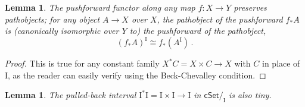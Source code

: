\documentclass[11pt,reqno]{amsart}
\newcommand{\cSet}{\ensuremath{\mathsf{cSet}}}
\renewcommand{\to}{\ensuremath{\rightarrow}}
\newcommand{\I}{\ensuremath{\mathrm{I}}}
\newtheorem{lemma}[theorem]{Lemma}
\theoremstyle{remark}
\theoremstyle{definition}
\begin{document}
\begin{lemma}\label{lemma:pathspacepushforward}
The pushforward functor along any map $f : X\to Y$ preserves pathobjects; for any object $A \to X$ over $X$, the pathobject of the pushforward $f_*A$ is (canonically isomorphic over $Y$ to) the pushforward of the pathobject,
\[
(f_*A)^\I \cong f_*(A^\I)\,.
\]
\end{lemma}
\begin{proof}
This is true for any constant family $X^*C = X\times C \to X$ with $C$ in place of $\I$, as the reader can easily verify using the Beck-Chevalley condition.
\end{proof}  


\begin{lemma}\label{lemma:tinyslicedI}
The pulled-back interval $\I^*\I = \I\times\I\to \I$ in $\cSet/_\I$ is also tiny.
\end{lemma}
\end{document}
